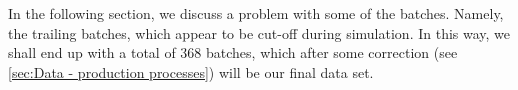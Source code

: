 \documentclass[../Thesis.tex]{subfiles}
\begin{document}
In the following section, we discuss a problem with some of the batches. Namely, the trailing batches, which appear to be cut-off during simulation. In this way, we shall end up with a total of 368 batches, which after some correction (see \autoref{sec:Data - production processes}) will be our final data set.




\end{document}
